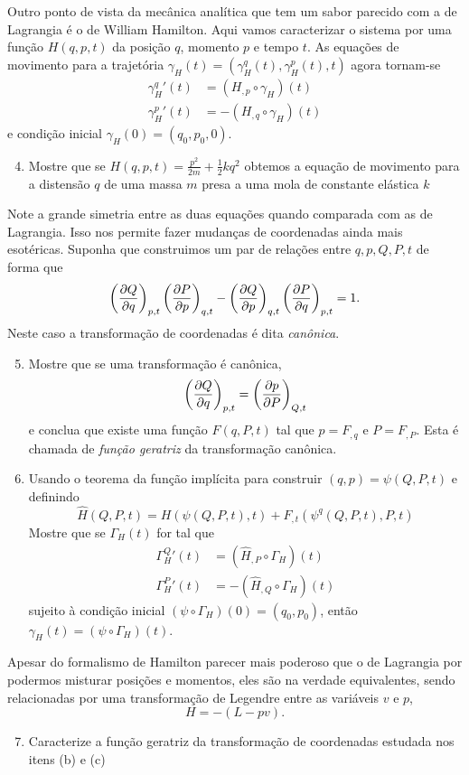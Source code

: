 \documentclass[a4paper, 12pt]{article}
\makeatletter
\newcommand\problemanswers{}
\newcommand{\answer}[1]{\listxadd{\problemanswers}{\thesection.\theenumi\ifnum\@enumdepth=2\theenumii\fi) \unexpanded{#1}}}
\newcommand{\pd}[3]{\ifblank{#3}{}{\left(}\frac{\partial #1}{\partial #2}\ifblank{#3}{}{\right)_{#3}}}
\theoremstyle{definition}
\theoremstyle{definition}
\makeatother
\begin{document}
\begin{enumerate}
    Outro ponto de vista da mecânica analítica que tem um sabor parecido com a de Lagrangia é o de 
    William Hamilton. Aqui vamos caracterizar o sistema por uma função $H(q,p,t)$ da posição
    $q$, momento $p$ e tempo $t$. As equações de movimento para a trajetória 
    $\gamma_H(t)=(\gamma_H^q(t),\gamma_H^p(t),t)$
    agora tornam-se
    \begin{align*}
        \gamma_H^q{'}(t)&=(H_{,p}\circ\gamma_H)(t)\\
        \gamma_H^p{'}(t)&=-(H_{,q}\circ\gamma_H)(t)
    \end{align*}
    e condição inicial $\gamma_H(0)=(q_0,p_0,0)$.
    \begin{enumerate}
        \setcounter{enumii}{3}
        \item Mostre que se $H(q,p,t)=\frac{p^2}{2m}+\frac{1}{2}kq^2$ obtemos a equação de movimento
        para a distensão $q$ de uma massa $m$ presa a uma mola de constante elástica $k$
    \end{enumerate}
    Note a grande simetria entre as duas equações quando comparada com as de Lagrangia. Isso nos permite
    fazer mudanças de coordenadas ainda mais esotéricas. Suponha que construimos um par de relações entre
    $q,p,Q,P,t$ de forma que
    $$\pd{Q}{q}{p,t}\pd{P}{p}{q,t}-\pd{Q}{p}{q,t}\pd{P}{q}{p,t}=1.$$
    Neste caso a transformação de coordenadas é dita \textit{canônica}.
    \begin{enumerate}
        \setcounter{enumii}{4}
        \item Mostre que se uma transformação é canônica,
        $$\pd{Q}{q}{p,t}=\pd{p}{P}{Q,t}$$
        e conclua que existe uma função $F(q,P,t)$ tal que $p=F_{,q}$ e $P=F_{,P}$. Esta é chamada de 
        \textit{função geratriz} da transformação canônica.
        \item Usando o teorema da função implícita para construir $(q,p)=\psi(Q,P,t)$ e definindo
        $$\hat H(Q,P,t)=H(\psi(Q,P,t),t)+F_{,t}(\psi^q(Q,P,t),P,t)$$
        Mostre que se $\Gamma_H(t)$ for tal que
        \begin{align*}
            \Gamma_H^Q{'}(t)&=(\hat H_{,P}\circ\Gamma_H)(t)\\
            \Gamma_H^P{'}(t)&=-(\hat H_{,Q}\circ\Gamma_H)(t)
        \end{align*}
        sujeito à condição inicial $(\psi\circ\Gamma_H)(0)=(q_0,p_0)$, então $\gamma_H(t)=(\psi\circ\Gamma_H)(t)$.
    \end{enumerate}
    Apesar do formalismo de Hamilton parecer mais poderoso que o de Lagrangia por podermos misturar 
    posições e momentos, eles são na verdade equivalentes, sendo relacionadas por uma transformação
    de Legendre entre as variáveis $v$ e $p$,
    $$H=-(L-pv).$$
    \begin{enumerate}
        \setcounter{enumii}{6}
        \item Caracterize a função geratriz da transformação de coordenadas estudada nos itens (b) e (c)
        \answer{$F(q,P,t)=P\varphi(q,t),\quad f(q,\varphi(q,t),t)=0$}
    \end{enumerate}
\end{enumerate}
\end{document}
